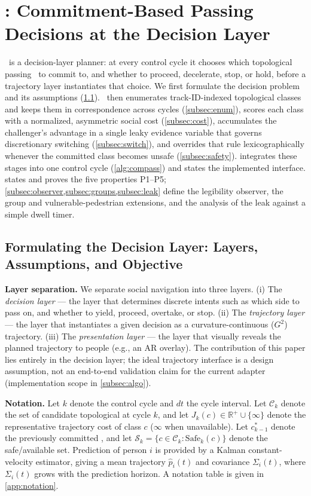 \section{\sname: Commitment-Based Passing Decisions at the Decision Layer}\label{sec:method}

\sname\ is a decision-layer planner: at every control cycle it chooses which topological passing \Class\ to commit to, and whether to proceed, decelerate, stop, or hold, before a trajectory layer instantiates that choice. We first formulate the decision problem and its assumptions (\cref{subsec:formulation}). \sname\ then enumerates track-ID-indexed topological classes and keeps them in correspondence across cycles (\cref{subsec:enum}), scores each class with a normalized, asymmetric social cost (\cref{subsec:cost}), accumulates the challenger's advantage in a single leaky evidence variable that governs discretionary switching (\cref{subsec:switch}), and overrides that rule lexicographically whenever the committed class becomes unsafe (\cref{subsec:safety}).  integrates these stages into one control cycle (\cref{alg:compass}) and states the implemented interface.  states and proves the five properties P1--P5; \cref{subsec:observer,subsec:groups,subsec:leak} define the legibility observer, the group and vulnerable-pedestrian extensions, and the analysis of the leak against a simple dwell timer.

\subsection{Formulating the Decision Layer: Layers, Assumptions, and Objective}\label{subsec:formulation}

\noindent\textbf{Layer separation.} We separate social navigation into three layers. (i) The \emph{decision layer} --- the layer that determines discrete intents such as which side to pass on, and whether to yield, proceed, overtake, or stop. (ii) The \emph{trajectory layer} --- the layer that instantiates a given decision as a curvature-continuous ($G^2$) trajectory. (iii) The \emph{presentation layer} --- the layer that visually reveals the planned trajectory to people (e.g., an AR overlay). The contribution of this paper lies entirely in the decision layer; the ideal trajectory interface is a design assumption, not an end-to-end validation claim for the current adapter (implementation scope in \cref{subsec:algo}).

\noindent\textbf{Notation.} Let $k$ denote the control cycle and $dt$ the cycle interval. Let $\mathcal{C}_k$ denote the set of candidate topological  at cycle $k$, and let $J_k(c) \in \mathbb{R}^+ \cup \{\infty\}$ denote the representative trajectory cost of class $c$ ($\infty$ when unavailable). Let $c^*_{k-1}$ denote the previously committed \Class, and let $\mathcal{S}_k = \{c \in \mathcal{C}_k : \mathrm{Safe}_k(c)\}$ denote the safe/available set. Prediction of person $i$ is provided by a Kalman constant-velocity estimator, giving a mean trajectory $\hat p_i(t)$ and covariance $\Sigma_i(t)$, where $\Sigma_i(t)$ grows with the prediction horizon. A notation table is given in \cref{app:notation}.

